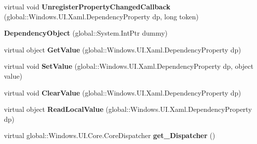 \begin{DoxyCompactItemize}
\item 
\mbox{\label{class_windows_1_1_u_i_1_1_xaml_1_1_dependency_object_a1038375289633f64b7f560eb26de036f}} 
virtual void {\bfseries Unregister\+Property\+Changed\+Callback} (global\+::\+Windows.\+U\+I.\+Xaml.\+Dependency\+Property dp, long token)
\item 
\mbox{\label{class_windows_1_1_u_i_1_1_xaml_1_1_dependency_object_a50ca400c3d5d8fb25c7f568083aab1b9}} 
{\bfseries Dependency\+Object} (global\+::\+System.\+Int\+Ptr dummy)
\item 
\mbox{\label{class_windows_1_1_u_i_1_1_xaml_1_1_dependency_object_ab7542d3826e3529750a867a66f41f33f}} 
virtual object {\bfseries Get\+Value} (global\+::\+Windows.\+U\+I.\+Xaml.\+Dependency\+Property dp)
\item 
\mbox{\label{class_windows_1_1_u_i_1_1_xaml_1_1_dependency_object_afbd5da79518b87e7eda7210ee248e8e2}} 
virtual void {\bfseries Set\+Value} (global\+::\+Windows.\+U\+I.\+Xaml.\+Dependency\+Property dp, object value)
\item 
\mbox{\label{class_windows_1_1_u_i_1_1_xaml_1_1_dependency_object_aae39f9b4dad56dfde575dd48bed82cd3}} 
virtual void {\bfseries Clear\+Value} (global\+::\+Windows.\+U\+I.\+Xaml.\+Dependency\+Property dp)
\item 
\mbox{\label{class_windows_1_1_u_i_1_1_xaml_1_1_dependency_object_adc36478eb501a1771f6d147333560730}} 
virtual object {\bfseries Read\+Local\+Value} (global\+::\+Windows.\+U\+I.\+Xaml.\+Dependency\+Property dp)
\item 
\mbox{\label{class_windows_1_1_u_i_1_1_xaml_1_1_dependency_object_a508c7b4f0ff4fbffc03e3c15071bccad}} 
virtual global\+::\+Windows.\+U\+I.\+Core.\+Core\+Dispatcher {\bfseries get\+\_\+\+Dispatcher} ()
\item 
\mbox{\label{class_windows_1_1_u_i_1_1_xaml_1_1_dependency_object_ab58e52b043959b48f59e0631b15126f7}} 

\end{DoxyCompactItemize}
